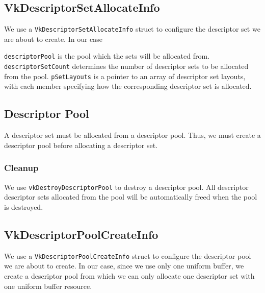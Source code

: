 \subsection{VkDescriptorSetAllocateInfo}

We use a \texttt{VkDescriptorSetAllocateInfo} struct to configure the descriptor
set we are about to create.
In our case

\texttt{descriptorPool} is the pool which the sets will be allocated from.
\texttt{descriptorSetCount} determines the number of descriptor sets to be
allocated from the pool.
\texttt{pSetLayouts} is a pointer to an array of descriptor set layouts,
with each member specifying how the corresponding descriptor set is allocated.

\begin{minipage}{\linewidth}{\noindent}
    
\end{minipage}

\subsection{Descriptor Pool}

A descriptor set must be allocated from a descriptor pool.
Thus, we must create a descriptor pool before allocating a descriptor set.

\begin{minipage}{\linewidth}{\noindent}
    
\end{minipage}

\subsubsection{Cleanup}

We use \texttt{vkDestroyDescriptorPool} to destroy a descriptor pool.
All descriptor descriptor sets allocated from the pool will be automatically
freed when the pool is destroyed.

\subsection{VkDescriptorPoolCreateInfo}

We use a \texttt{VkDescriptorPoolCreateInfo} struct to configure the descriptor
pool we are about to create.
In our case, since we use only one uniform buffer, we create a descriptor pool
from which we can only allocate one descriptor set with one uniform buffer resource.

